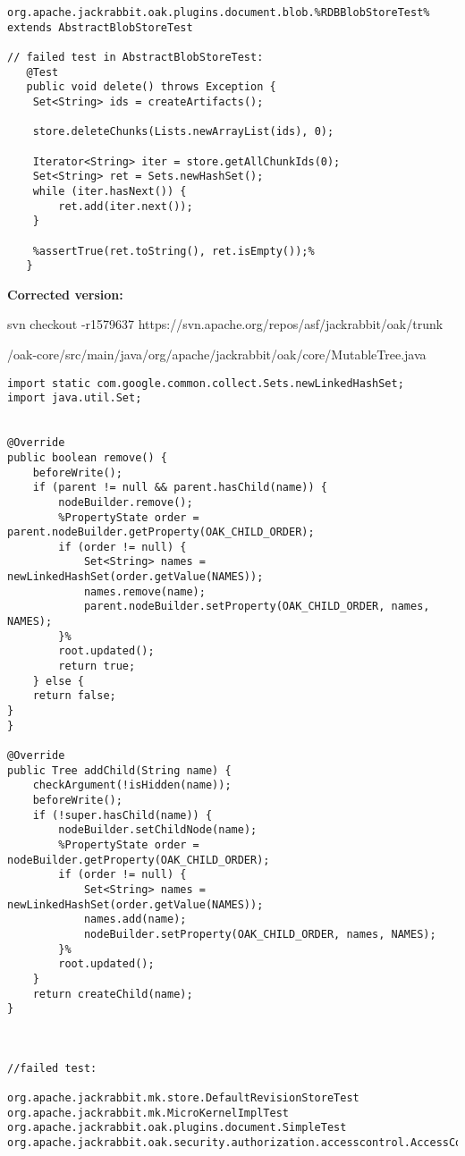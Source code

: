 \documentclass{article}
\begin{document}
\begin{lstlisting}[frame=single]
org.apache.jackrabbit.oak.plugins.document.blob.%RDBBlobStoreTest% extends AbstractBlobStoreTest

// failed test in AbstractBlobStoreTest:
   @Test
   public void delete() throws Exception {
   	Set<String> ids = createArtifacts();
   	
   	store.deleteChunks(Lists.newArrayList(ids), 0);
   	
   	Iterator<String> iter = store.getAllChunkIds(0);
   	Set<String> ret = Sets.newHashSet();
   	while (iter.hasNext()) {
   		ret.add(iter.next());
   	}
   	
   	%assertTrue(ret.toString(), ret.isEmpty());%
   }

\end{lstlisting}
\clearpage
\textbf{Corrected version:}

svn checkout -r1579637 https://svn.apache.org/repos/asf/jackrabbit/oak/trunk

/oak-core/src/main/java/org/apache/jackrabbit/oak/core/MutableTree.java

\begin{lstlisting}[frame=single]
import static com.google.common.collect.Sets.newLinkedHashSet;
import java.util.Set;


@Override
public boolean remove() {
	beforeWrite();
	if (parent != null && parent.hasChild(name)) {
		nodeBuilder.remove();
		%PropertyState order = parent.nodeBuilder.getProperty(OAK_CHILD_ORDER);
		if (order != null) {
			Set<String> names = newLinkedHashSet(order.getValue(NAMES));
			names.remove(name);
			parent.nodeBuilder.setProperty(OAK_CHILD_ORDER, names, NAMES);
		}%
		root.updated();
		return true;
	} else {
	return false;
}
}

@Override
public Tree addChild(String name) {
	checkArgument(!isHidden(name));
	beforeWrite();
	if (!super.hasChild(name)) {
		nodeBuilder.setChildNode(name);
		%PropertyState order = nodeBuilder.getProperty(OAK_CHILD_ORDER);
		if (order != null) {
			Set<String> names = newLinkedHashSet(order.getValue(NAMES));
			names.add(name);
			nodeBuilder.setProperty(OAK_CHILD_ORDER, names, NAMES);
		}%
		root.updated();
	}
	return createChild(name);
}



//failed test:

org.apache.jackrabbit.mk.store.DefaultRevisionStoreTest
org.apache.jackrabbit.mk.MicroKernelImplTest
org.apache.jackrabbit.oak.plugins.document.SimpleTest
org.apache.jackrabbit.oak.security.authorization.accesscontrol.AccessControlManagerImplTest


\end{lstlisting}
\end{document}
